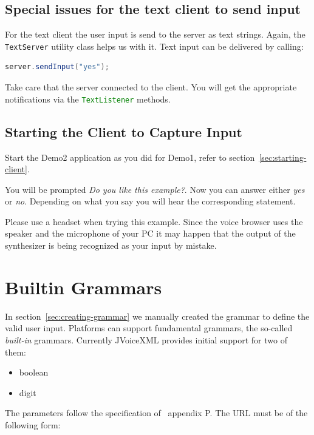 \documentclass[11pt,a4paper]{article}
\begin{document}
\subsection{Special issues for the text client to send input}

For the text client the user input is send to the server as text strings. Again,
the \lstinline[language=Java]{TextServer} utility class helps us with it.
Text input can be delivered by calling:

\begin{lstlisting}[language=Java]
    server.sendInput("yes");
\end{lstlisting}

Take care that the server connected to the client. You will get the
appropriate notifications via the \lstinline[language=java]{TextListener}
methods.

\subsection{Starting the Client to Capture Input}
\label{sec:starting-the-client}

Start the Demo2 application as you did for Demo1, refer to
section~\ref{sec:starting-client}.

You will be prompted \emph{Do you like this example?}. Now you can answer
either \emph{yes} or \emph{no}. Depending on what you say you will hear the
corresponding statement.

Please use a headset when trying this example. Since the voice browser uses the
speaker and the microphone of your PC it may happen that the output of the
synthesizer is being recognized as your input by mistake.

\section{Builtin Grammars}

In section~\ref{sec:creating-grammar} we manually created the grammar to
define the valid user input. Platforms can support fundamental grammars, the
so-called \emph{built-in} grammars. Currently JVoiceXML provides initial support
for two of them:
\begin{itemize}
  \item boolean
  \item digit
\end{itemize}

The parameters follow the specification of~\cite{w3.org:voicexml} appendix P.
The URL must be of the following form:
\end{document}
